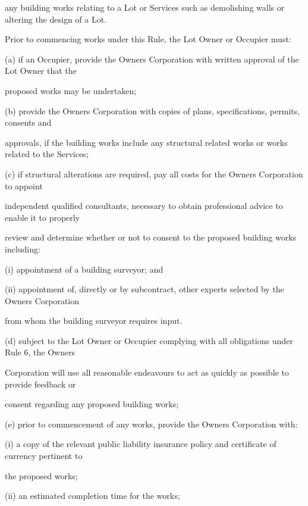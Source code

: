 \documentclass{article}
\begin{document}
{\fontsize{10.02}{1}any building works relating to a Lot or Services such as demolishing walls or altering the design of a Lot. }

{\fontsize{10.02}{1}Prior to commencing works under this Rule, the Lot Owner or Occupier must: }

{\fontsize{9.962}{1}(a) if an Occupier, provide the Owners Corporation with written approval of the Lot Owner that the }

{\fontsize{10.02}{1}proposed works may be undertaken; }

{\fontsize{9.962}{1}(b) provide the Owners Corporation with copies of plans, specifications, permits, consents and }

{\fontsize{10.02}{1}approvals, if the building works include any structural related works or works related to the Services; }

{\fontsize{9.962}{1}(c) if structural alterations are required, pay all costs for the Owners Corporation to appoint }

{\fontsize{10.02}{1}independent qualified consultants, necessary to obtain professional advice to enable it to properly }

{\fontsize{10.02}{1}review and determine whether or not to consent to the proposed building works including: }

{\fontsize{9.962}{1}(i) appointment of a building surveyor; and }

{\fontsize{9.962}{1}(ii) appointment of, directly or by subcontract, other experts selected by the Owners Corporation }

{\fontsize{10.02}{1}from whom the building surveyor requires input. }

{\fontsize{9.962}{1}(d) subject to the Lot Owner or Occupier complying with all obligations under Rule 6, the Owners }

{\fontsize{10.02}{1}Corporation will use all reasonable endeavours to act as quickly as possible to provide feedback or }

{\fontsize{10.02}{1}consent regarding any proposed building works; }

{\fontsize{9.962}{1}(e) prior to commencement of any works, provide the Owners Corporation with: }

{\fontsize{9.962}{1}(i) a copy of the relevant public liability insurance policy and certificate of currency pertinent to }

{\fontsize{10.02}{1}the proposed works; }

{\fontsize{9.962}{1}(ii) an estimated completion time for the works; }
\end{document}
